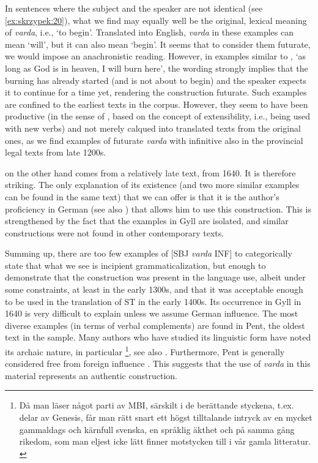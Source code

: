 \documentclass[output=paper,colorlinks,citecolor=brown]{langscibook}
\begin{document}
In sentences where the subject and the speaker are not identical (see \ref{ex:skrzypek:20}), what we find may equally well be the original, lexical meaning of \textit{varda}, i.e., ‘to begin’. Translated into English, \textit{varda} in these examples can mean ‘will’, but it can also mean ‘begin’. It seems that to consider them futurate, we would impose an anachronistic reading. However, in examples similar to , ‘as long as God is in heaven, I will burn here’, the wording strongly implies that the burning has already started (and is not about to begin) and the speaker expects it to continue for a time yet, rendering the construction futurate. Such examples are confined to the earliest texts in the corpus. However, they seem to have been productive (in the sense of \citet{Barddal2008}, based on the concept of extensibility, i.e., being used with new verbs) and not merely calqued into translated texts from the original ones, as we find examples of futurate \textit{varda} with infinitive also in the provincial legal texts from late 1200s.

 on the other hand comes from a relatively late text, from 1640. It is therefore striking. The only explanation of its existence (and two more similar examples can be found in the same text) that we can offer is that it is the author’s proficiency in German (see also \cite{MagnussonPetzell2014}) that allows him to use this construction. This is strengthened by the fact that the examples in Gyll are isolated, and similar constructions were not found in other contemporary texts. 

Summing up, there are too few examples of [SBJ \textit{varda} INF] to categorically state that what we see is incipient grammaticalization, but enough to demonstrate that the construction was present in the language use, albeit under some constraints, at least in the early 1300s, and that it was acceptable enough to be used in the translation of ST in the early 1400s. Its occurrence in Gyll in 1640 is very difficult to explain unless we assume German influence. The most diverse examples (in terms of verbal complements) are found in Pent, the oldest text in the sample. Many authors who have studied its linguistic form have noted its archaic nature, in particular \citet{Hesselman1927}\footnote{Då man läser något parti av MBI, särskilt i de berättande styckena, t.ex. delar av Genesis, får man rätt snart ett högst tilltalande intryck av en mycket gammaldags och kärnfull svenska, en språklig äkthet och på samma gång rikedom, som man eljest icke lätt finner motstycken till i vår gamla litteratur. \citep[21]{Hesselman1927}}, see also \citet{Thorell1959}. Furthermore, Pent is generally considered free from foreign influence \citep{Wollin2001}. This suggests that the use of \textit{varda} in this material represents an authentic construction. 
\end{document}
